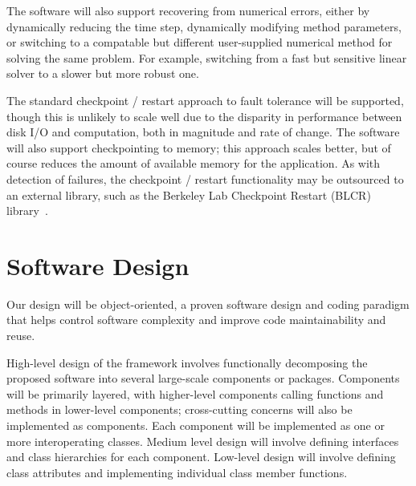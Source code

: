 \documentclass[10pt,twocolumn]{article}
\begin{document}
The software will also support recovering from numerical errors,
either by dynamically reducing the time step, dynamically modifying
method parameters, or switching to a compatable but different
user-supplied numerical method for solving the same problem.  For
example, switching from a fast but sensitive linear solver to a slower
but more robust one.

The standard checkpoint / restart approach to fault tolerance will be
supported, though this is unlikely to scale well due to the disparity
in performance between disk I/O and computation, both in magnitude and
rate of change.  The software will also support checkpointing to
memory; this approach scales better, but of course reduces the amount
of available memory for the application.  As with detection of
failures, the checkpoint / restart functionality may be outsourced to
an external library, such as the Berkeley Lab Checkpoint Restart
(BLCR) library~\cite{wwwblcr}.


\section{Software Design} \label{s:design}


Our design will be object-oriented, a proven software design and
coding paradigm that helps control software complexity and improve
code maintainability and reuse.

High-level design of the framework involves functionally decomposing
the proposed software into several large-scale components or packages.
Components will be primarily layered, with higher-level components
calling functions and methods in lower-level components; cross-cutting
concerns will also be implemented as components.  Each component will
be implemented as one or more interoperating classes.  Medium level
design will involve defining interfaces and class hierarchies for each
component.  Low-level design will involve defining class attributes
and implementing individual class member functions.
\end{document}
